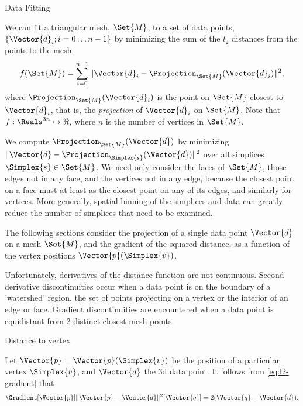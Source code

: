 \begin{plSection}{Data Fitting}
\label{sec:data-fitting}

We can fit a triangular mesh, $\Set{M}$, to a set of data points, 
$\{\Vector{d}_i; i=0 \ldots n-1\}$
by minimizing the sum of the $l_2$ distances from the points to the mesh:
\begin{equation}
f(\Set{M}) = \sum_{i=0}^{n-1} 
\|\Vector{d}_i - \Projection_{\Set{M}} (\Vector{d}_i)\|^2 ,
\end{equation}
where $\Projection_{\Set{M}} (\Vector{d}_i)$ 
is the point on $\Set{M}$ closest to $\Vector{d}_i$,
that is, the {\em projection} of $\Vector{d}_i$ on $\Set{M}$.
Note that $f:\Reals^{3n} \mapsto \Re$,
where $n$ is the number of vertices in $\Set{M}$.

We compute $\Projection_{\Set{M}} (\Vector{d})$ by minimizing  
$\|\Vector{d}-\Projection_\Simplex{s} (\Vector{d})\|^2$
over all simplices $\Simplex{s} \in \Set{M}$.
We need only consider the faces of $\Set{M}$,
those edges not in any face,
and the vertices not in any edge,
because the closest point on a face must at least
as the closest point on any of its edges,
and similarly for vertices.
More generally, spatial binning of the simplices and data can greatly
reduce the number of simplices that need to be examined.

The following sections consider the projection of a single
data point $\Vector{d}$ on a mesh $\Set{M}$,
and the gradient of the squared distance,
as a function of the vertex positions $\Vector{p}(\Simplex{v})$.

Unfortunately, derivatives of the distance function are not continuous.
Second derivative discontinuities occur
when a data point is on the boundary
of a 'watershed' region, the set of points
projecting on a vertex or the interior of an edge or face.
Gradient discontinuities are encountered
when a data point is equidistant from 2 distinct closest mesh points.

\begin{plSection}{Distance to vertex}
\label{sec:Distance-to-vertex}

Let $\Vector{p} = \Vector{p}(\Simplex{v})$ 
be the position of a particular vertex $\Simplex{v}$,
and $\Vector{d}$ the 3d data point.
It follows from \cref{eq:l2-gradient} that
\begin{equation}
\label{eq:vertex-distance-gradient}
\Gradient[\Vector{p}]{\|\Vector{p}-\Vector{d}\|^2}[\Vector{q}] 
= 2 ( \Vector{q}-\Vector{d} ).
\end{equation}


\end{plSection}
\end{plSection}
